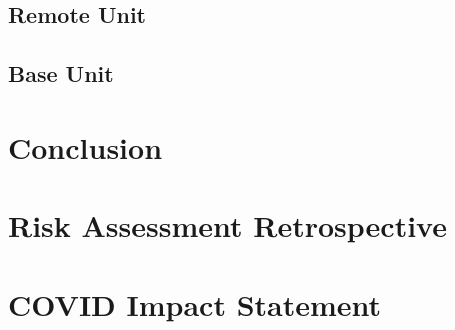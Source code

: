 \documentclass{IIBproject}
\begin{document}
\subsection{Remote Unit}

\subsection{Base Unit}

\section{Conclusion}



\newpage




\newpage
\appendix
\appendixpage
\addappheadtotoc

\section{Risk Assessment Retrospective}
\section{COVID Impact Statement}
\end{document}
